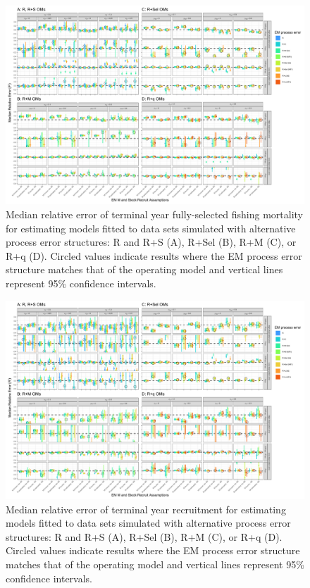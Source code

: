 \documentclass[
  12pt,
]{article}
\begin{document}
\begin{landscape}
\begin{figure}
\begin{center}
\includegraphics{term_F_bias_plots}
\end{center}
\caption{Median relative error of terminal year fully-selected fishing mortality for estimating models fitted to data sets simulated with alternative process error structures: R and R+S (A), R+Sel (B), R+M (C), or R+q (D). Circled values indicate results where the EM process error structure matches that of the operating model and vertical lines represent 95\% confidence intervals.}\label{F_rel_error}
\end{figure}
\end{landscape}

\begin{landscape}
\begin{figure}
\begin{center}
\includegraphics{term_R_bias_plots}
\end{center}
\caption{Median relative error of terminal year recruitment for estimating models fitted to data sets simulated with alternative process error structures: R and R+S (A), R+Sel (B), R+M (C), or R+q (D). Circled values indicate results where the EM process error structure matches that of the operating model and vertical lines represent 95\% confidence intervals.}\label{R_rel_error}
\end{figure}
\end{landscape}
\end{document}
